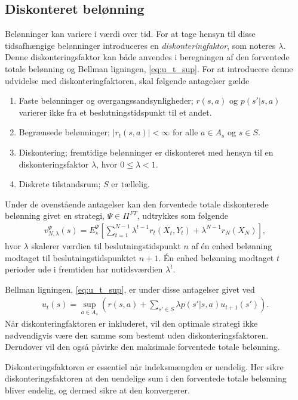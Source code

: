 \subsection{Diskonteret belønning}
Belønninger kan variere i værdi over tid. For at tage hensyn til disse tidsafhængige belønninger introduceres en \textit{diskonteringfaktor}, som noteres $\lambda$. Denne diskonteringsfaktor kan både anvendes i beregningen af den forventede totale belønning og Bellman ligningen, \ref{eq:u_t_sup}. For at introducere denne udvidelse med diskonteringfaktoren, skal følgende antagelser gælde

\begin{enumerate}
    \item Faste belønninger og overgangssandsynligheder; $r(s,a)$ og $p(s'|s,a)$ varierer ikke fra et beslutningstidspunkt til et andet.
    \item Begrænsede belønninger; $|r_t(s,a)| < \infty$ for alle $a\in A_s$ og $s\in S$.
    \item Diskontering; fremtidige belønninger er diskonteret med hensyn til en diskonteringsfaktor $\lambda$, hvor $0 \leq \lambda < 1$.
    \item Diskrete tilstandsrum; $S$ er tællelig.
\end{enumerate}

Under de ovenstående antagelser kan den forventede totale diskonterede belønning givet en strategi, $\Psi\in \Pi^{FT}$, udtrykkes som følgende 
\begin{align*}
    v_{N,\lambda}^\Psi(s)=E_s^\Psi\left[\sum_{t=1}^{N-1}\lambda^{t-1}r_t(X_t, Y_t)+\lambda^{N-1}r_N(X_N)\right],
\end{align*}
hvor $\lambda$ skalerer værdien til beslutningstidspunkt $n$ af én enhed belønning modtaget til beslutningstidspunktet $n+1$. Én enhed belønning modtaget $t$ perioder ude i fremtiden har nutidsværdien $\lambda^t$.

Bellman ligningen, \eqref{eq:u_t_sup}, er under disse antagelser givet ved
\begin{align*}
    u_t(s) = \sup_{a \in A_s} \left( r(s,a) + \sum_{s'\in S} \lambda p\left(s'|s,a\right)u_{t+1}(s')\right).
\end{align*}
Når diskonteringfaktoren er inkluderet, vil den optimale strategi ikke nødvendigvis være den samme som bestemt uden diskonteringsfaktoren. Derudover vil den også påvirke den maksimale forventede totale belønning. 

Diskonteringsfaktoren er essentiel når indeksmængden er uendelig. Her sikre diskonteringsfaktoren at den uendelige sum i den forventede totale belønning bliver endelig, og dermed sikre at den konvergerer. 

